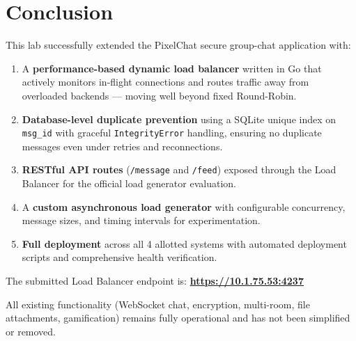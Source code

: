\documentclass[12pt, a4paper]{article}
\begin{document}
\section{Conclusion}

This lab successfully extended the PixelChat secure group-chat application with:

\begin{enumerate}
    \item A \textbf{performance-based dynamic load balancer} written in Go that actively monitors in-flight connections and routes traffic away from overloaded backends — moving well beyond fixed Round-Robin.
    \item \textbf{Database-level duplicate prevention} using a SQLite unique index on \texttt{msg\_id} with graceful \texttt{IntegrityError} handling, ensuring no duplicate messages even under retries and reconnections.
    \item \textbf{RESTful API routes} (\texttt{/message} and \texttt{/feed}) exposed through the Load Balancer for the official load generator evaluation.
    \item A \textbf{custom asynchronous load generator} with configurable concurrency, message sizes, and timing intervals for experimentation.
    \item \textbf{Full deployment} across all 4 allotted systems with automated deployment scripts and comprehensive health verification.
\end{enumerate}

The submitted Load Balancer endpoint is: \textbf{\url{https://10.1.75.53:4237}}

All existing functionality (WebSocket chat, encryption, multi-room, file attachments, gamification) remains fully operational and has not been simplified or removed.
\end{document}

